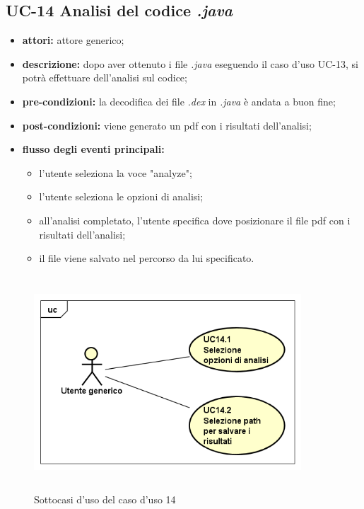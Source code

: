 \subsection*{UC-14 Analisi del codice \textit{.java}}\label{subsec:uc-14-analisi-del-codicetextit}
\begin{itemize}
    \item \textbf{attori:} attore generico;
    \item \textbf{descrizione:} dopo aver ottenuto i file \textit{.java} eseguendo il caso d'uso UC-13, si potr\`{a} effettuare dell'analisi sul codice;
    \item \textbf{pre-condizioni:} la decodifica dei file \textit{.dex} in \textit{.java} \`{e} andata a buon fine;
    \item \textbf{post-condizioni:} viene generato un pdf con i risultati dell'analisi;
    \item \textbf{flusso degli eventi principali:}
    \begin{itemize}
        \item l'utente seleziona la voce "analyze";
        \item l'utente seleziona le opzioni di analisi;
        \item all'analisi completato, l'utente specifica dove posizionare il file pdf con i risultati dell'analisi;
        \item il file viene salvato nel percorso da lui specificato.
    \end{itemize}
\end{itemize}
\begin{figure}[H]
    \centering
    \includegraphics[width=10cm, height=8cm]{./immagini/usecase/uc_14_1_14_2.png}
    \caption{Sottocasi d'uso del caso d'uso 14}
\end{figure}



